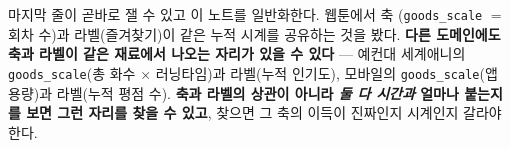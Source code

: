 \documentclass[10pt]{article}
\begin{document}
마지막 줄이 곧바로 잴 수 있고 이 노트를 일반화한다. 웹툰에서 축
(\texttt{goods\_scale} $=$ 회차 수)과 라벨(즐겨찾기)이 같은 누적 시계를
공유하는 것을 봤다. \textbf{다른 도메인에도 축과 라벨이 같은 재료에서
나오는 자리가 있을 수 있다} --- 예컨대 세계애니의
\texttt{goods\_scale}(총 화수 $\times$ 러닝타임)과 라벨(누적 인기도),
모바일의 \texttt{goods\_scale}(앱 용량)과 라벨(누적 평점 수). \textbf{축과
라벨의 상관이 아니라 \emph{둘 다 시간과} 얼마나 붙는지를 보면 그런 자리를
찾을 수 있고}, 찾으면 그 축의 이득이 진짜인지 시계인지 갈라야 한다.
\end{document}
